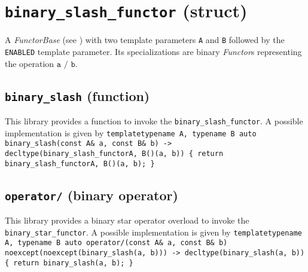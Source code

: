 %
%
%
%
%
%
%

\section{\texttt{binary\_slash\_functor} (struct)}
A \textit{FunctorBase} (see \cite{functors}) with two template parameters \texttt{A} and \texttt{B} followed by the \texttt{ENABLED} template parameter.
Its specializations are binary \textit{Functor}s representing the operation $\texttt{a / b}$.

\subsection{\texttt{binary\_slash} (function)}
This library provides a function to invoke the \texttt{binary\_slash\_functor}.
A possible implementation is given by\newline
\texttt{template\textlangle typename A, typename B\textrangle\newline
auto\newline
binary\_slash(const A\& a, const B\& b)\newline
-> decltype(binary\_slash\_functor\textlangle A, B\textrangle()(a, b))\newline
\{ return binary\_slash\_functor\textlangle A, B\textrangle()(a, b); \}}

\subsection{\texttt{operator/} (binary operator)}
This library provides a binary star operator overload to invoke the \texttt{binary\_star\_functor}.
A possible implementation is given by\newline
\texttt{template\textlangle typename A, typename B\textrangle\newline
auto\newline
operator/(const A\& a, const B\& b)\newline
noexcept(noexcept(binary\_slash(a, b)))\newline
-> decltype(binary\_slash(a, b))\newline
\{ return binary\_slash(a, b); \}}

